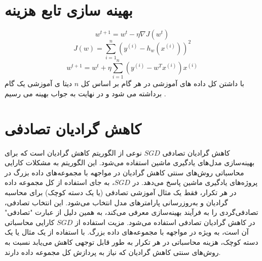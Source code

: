 \documentclass[12pt]{article}
\begin{document}
\section*{بهینه سازی تابع هزینه}
$$ 
w^{t+1} = w^t - \eta \nabla J(w^t)$$
$$
J(w) = \sum_{i=1}^{n} (y^{(i)} - h_w (x^{(i)}))^2$$
$$
w^{t+1} = w^t + \eta \sum_{i=1}^{n}(y^{(i)} - w^T x^{(i)}) x^{(i)}$$
با داشتن کل داده های آموزشی در هر گام 
بر اساس کل $n$ دیتا ی آموزشی یک گام برداشته می شود و در نهایت به جواب بهینه می رسیم .

\section*{کاهش گرادیان تصادفی}

کاهش گرادیان تصادفی $SGD$ نوعی از الگوریتم کاهش گرادیان است که برای بهینه‌سازی مدل‌های یادگیری ماشین استفاده می‌شود. این الگوریتم به مشکلات کارایی محاسباتی روش‌های سنتی کاهش گرادیان در مواجهه با مجموعه‌های داده بزرگ در پروژه‌های یادگیری ماشین پاسخ می‌دهد.
در $SGD$، به جای استفاده از کل مجموعه داده در هر تکرار، فقط یک مثال آموزشی تصادفی (یا یک دسته کوچک) برای محاسبه گرادیان و به‌روزرسانی پارامترهای مدل انتخاب می‌شود. این انتخاب تصادفی، تصادفی‌گردی را به فرآیند بهینه‌سازی معرفی می‌کند، به همین دلیل از عبارت "تصادفی" در کاهش گرادیان تصادفی استفاده می‌شود.
مزیت استفاده از $SGD$ کارایی محاسباتی آن است، به ویژه در مواجهه با مجموعه‌های داده بزرگ. با استفاده از یک مثال یا یک دسته کوچک، هزینه محاسباتی در هر تکرار به طور قابل توجهی کاهش می‌یابد نسبت به روش‌های سنتی کاهش گرادیان که نیاز به پردازش کل مجموعه داده دارند.
\end{document}
